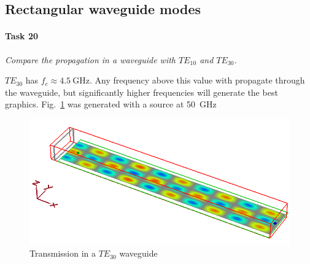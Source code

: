 \subsection{Rectangular waveguide modes}
\paragraph{Task 20}\textit{Compare the propagation in a waveguide with $TE_{10}$ and $TE_{30}$.}

$TE_{30}$ has $f_c \approx \SI{4.5}{\giga\hertz}$.
Any frequency above this value with propagate through the waveguide, but significantly higher frequencies will generate the best graphics.
Fig.~\ref{fig:Task20-T30-50GHz} was generated with a source at \SI{50}{\giga\hertz}

\begin{figure}[tbph]
	\centering
	\includegraphics[width=0.7\linewidth]{graphics/Task20-T30-50GHz}
	\caption{Transmission in a $TE_{30}$ waveguide}
	\label{fig:Task20-T30-50GHz}
\end{figure}

